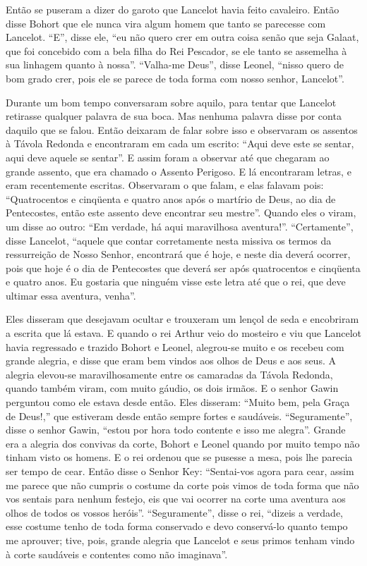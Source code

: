 Então se puseram a dizer do garoto que Lancelot havia feito cavaleiro. Então
disse Bohort que ele nunca vira algum homem que tanto se parecesse com
Lancelot. “E”, disse ele, “eu não quero crer em outra coisa senão que seja
Galaat, que foi concebido com a bela filha do Rei Pescador, se ele tanto se
assemelha à sua linhagem quanto à nossa”. “Valha-me Deus”, disse Leonel, “nisso
quero de bom grado crer, pois ele se parece de toda forma com nosso senhor, Lancelot”.

Durante um bom tempo conversaram sobre aquilo, para tentar que Lancelot
retirasse qualquer palavra de sua boca. Mas nenhuma palavra disse por conta
daquilo que se falou. Então deixaram de falar sobre isso e observaram os
assentos à Távola Redonda e encontraram em cada um escrito: “Aqui deve este se
sentar, aqui deve aquele se sentar”. E assim foram a observar até que chegaram
ao grande assento, que era chamado o Assento Perigoso. E lá encontraram letras,
e eram recentemente escritas. Observaram o que falam, e elas falavam pois: 
“Quatrocentos e cinqüenta e quatro anos após o martírio de Deus, ao dia de
Pentecostes, então este assento deve encontrar seu mestre”. Quando eles o
viram, um disse ao outro: “Em verdade, há aqui maravilhosa aventura!”.
“Certamente”, disse Lancelot, “aquele que contar corretamente nesta missiva os
termos da ressurreição de Nosso Senhor, encontrará que é hoje, e neste dia
deverá ocorrer, pois que hoje é o dia de Pentecostes que deverá ser após
quatrocentos e cinqüenta e quatro anos. Eu gostaria que ninguém visse este
letra até que o rei, que deve ultimar essa aventura, venha”. 

Eles disseram que desejavam ocultar e trouxeram um lençol de seda e encobriram a
escrita que lá estava. E quando o rei Arthur veio do mosteiro e viu que
Lancelot havia regressado e trazido Bohort e Leonel, alegrou-se muito e os
recebeu com grande alegria, e disse que eram bem vindos aos olhos de Deus e aos
seus. A alegria elevou-se maravilhosamente entre os camaradas da Távola
Redonda, quando também viram, com muito gáudio, os dois irmãos. E o senhor
Gawin perguntou como ele estava desde então. Eles disseram: “Muito bem, pela
Graça de Deus!,” que estiveram desde então sempre fortes e saudáveis.
“Seguramente”, disse o senhor Gawin, “estou por hora todo contente e isso me
alegra”. Grande era a alegria dos convivas da corte, Bohort e Leonel quando por
muito tempo não tinham visto os homens. E o rei ordenou que se pusesse a mesa,
pois lhe parecia ser tempo de cear. Então disse o Senhor Key: “Sentai-vos agora
para cear, assim me parece que não cumpris o costume da corte pois vimos de
toda forma que não vos sentais para nenhum festejo, eis que vai ocorrer na
corte uma aventura aos olhos de todos os vossos heróis”. “Seguramente”, disse o
rei, “dizeis a verdade, esse costume tenho de toda forma conservado e devo
conservá-lo quanto tempo me aprouver; tive, pois, grande alegria que Lancelot
e seus primos tenham vindo à corte saudáveis e contentes como não imaginava”. 

